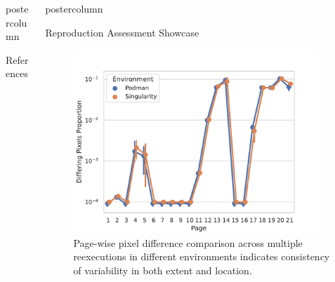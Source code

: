 \begin{frame}
\begin{columns}
\begin{column}{.42\textwidth}
\begin{beamercolorbox}[center]{postercolumn}
\begin{minipage}{.98\textwidth}
{\begin{myblock}{References}
\begin{minipage}{.3\textwidth}
\begin{figure}
							\end{figure}
						\end{minipage}
						\begin{minipage}{.69\textwidth}
							\scriptsize
                                                        
                                                        
						\end{minipage}
					\end{myblock}\vfill
		}\end{minipage}\end{beamercolorbox}
	\end{column}
	\begin{column}{.59\textwidth}
		\begin{beamercolorbox}[center]{postercolumn}
			\begin{minipage}{.98\textwidth} %
				\parbox[t][\columnheight]{\textwidth}{ %
					\begin{myblock}{Reproduction Assessment Showcase}
						\vspace{-0.45em}
						\begin{minipage}{.58\textwidth}
						\begin{figure}
							\includegraphics[width=0.95\textwidth]{img/diff_pages.pdf}
							\vspace{0.2em}
							\caption{
								Page-wise pixel difference comparison across multiple reexecutions in different environments indicates consistency of variability in both extent and location.
							}
							\label{fig:ras_s}

\end{figure}
\end{minipage}
\end{myblock}}
\end{minipage}
\end{beamercolorbox}
\end{column}
\end{columns}
\end{frame}
